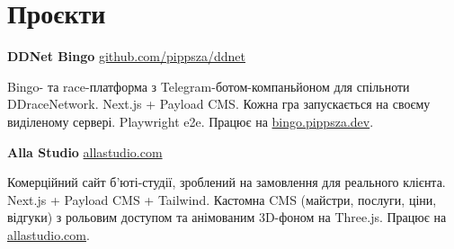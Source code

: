 \documentclass[11pt,a4paper]{article}
\newcommand{\sidebarwidth}{5.8cm}
\begin{document}
\begin{minipage}[t]{\dimexpr\paperwidth-\sidebarwidth\relax}
\begin{minipage}[t]{\dimexpr\paperwidth-\sidebarwidth-1.8cm\relax}
\section*{Проєкти}

{\bfseries DDNet Bingo} \quad \href{https://github.com/pippsza/ddnet}{\color{accent}\small github.com/pippsza/ddnet}\par
\vspace{2pt}
Bingo- та race-платформа з Telegram-ботом-компаньйоном для спільноти
DDraceNetwork. Next.js + Payload CMS. Кожна гра запускається на своєму
виділеному сервері. Playwright e2e.
Працює на \href{https://bingo.pippsza.dev}{bingo.pippsza.dev}.

\vspace{6pt}
{\bfseries Alla Studio} \quad \href{https://allastudio.com}{\color{accent}\small allastudio.com}\par
\vspace{2pt}
Комерційний сайт б'юті-студії, зроблений на замовлення для реального клієнта.
Next.js + Payload CMS + Tailwind. Кастомна CMS (майстри, послуги, ціни,
відгуки) з рольовим доступом та анімованим 3D-фоном на Three.js. Працює
на \href{https://allastudio.com}{allastudio.com}.

\end{minipage}
\end{minipage}
\end{document}

